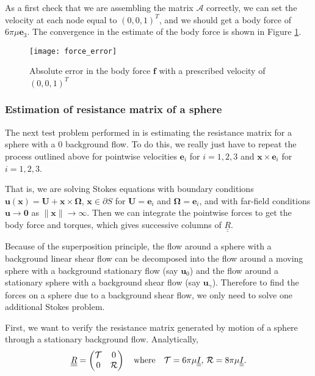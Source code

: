 \documentclass{article}
\newcommand{\tn}{\textnormal}
\begin{document}
As a first check that we are assembling the matrix $\mathcal{A}$
correctly, we can set the velocity at each node equal to $(0, 0,
1)^T$, and we should get a body force of $6\pi \mu \mathbf{e}_3$. The
convergence in the estimate of the body force is shown in Figure
\ref{fig:force_error}. 

\begin{figure}
  \centering
  \texttt{[image: force\_error]}
  \caption{Absolute error in the body force $\mathbf{f}$ with a
    prescribed velocity of $(0, 0, 1)^T$}
  \label{fig:force_error}
\end{figure}

\subsubsection{Estimation of resistance matrix of a sphere}
\label{sec:estim-resist-matr}

The next test problem performed in \cite{Cortez2005} is estimating the
resistance matrix for a sphere with a 0 background flow. To do this,
we really just have to repeat the process outlined above for pointwise
velocities $\mathbf{e}_i$ for $i = 1, 2, 3$ and $\mathbf{x} \times
\mathbf{e}_i$ for $i = 1, 2, 3$.

That is, we are solving Stokes equations with boundary conditions
$\mathbf{u}(\mathbf{x}) = \mathbf{U} + \mathbf{x} \times
\mathbf{\Omega}$, $\mathbf{x} \in \partial S$ for $\mathbf{U} =
\mathbf{e}_i$ and $\mathbf{\Omega} = \mathbf{e}_i$, and with far-field
conditions $\mathbf{u} \rightarrow \boldsymbol{0}$ as $\|\mathbf{x}\|
\rightarrow \infty$. Then we can integrate the pointwise forces to get
the body force and torques, which gives successive columns of
$\underline{\underline{R}}$.

Because of the superposition principle, the flow around a sphere with
a background linear shear flow can be decomposed into the flow around
a moving sphere with a background stationary flow (say $\mathbf{u}_0$)
and the flow around a stationary sphere with a background shear flow
(say $\mathbf{u}_\gamma$). Therefore to find the forces on a sphere
due to a background shear flow, we only need to solve one additional
Stokes problem.

First, we want to verify the resistance matrix generated by motion of
a sphere through a stationary background flow. Analytically,
\begin{equation}
  \underline{\underline{R}} =
  \begin{pmatrix}
    \mathcal{T} & 0 \\
    0 & \mathcal{R}
  \end{pmatrix} \quad \tn{where} \quad \mathcal{T} = 6\pi \mu
  \underline{\underline{I}}, \, \mathcal{R} = 8 \pi \mu
  \underline{\underline{I}}.
\end{equation}
\end{document}
